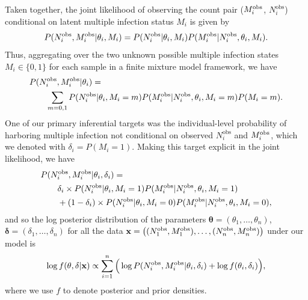 \documentclass[10pt,letterpaper]{article}
\newcommand{\MI}{M^{\text{\text{obs}}}}
\begin{document}
Taken together, the joint likelihood of observing the count pair  ($\MI_i$, $N^{\text{obs}}_i$) conditional on latent multiple infection status $M_i$ is given by 
\begin{equation}
P(N^{\text{obs}}_i, \MI_i | \theta_i, M_i) = P(N^{\text{obs}}_i |  \theta_i, M_i)P(\MI_i | N^{\text{obs}}_i, \theta_i, M_i).
\end{equation}
Thus, aggregating over the two unknown possible multiple infection states $M_i\in\{0,1\}$ for each sample in a finite mixture model framework, we have
\begin{equation}
\begin{split}
& P(N^{\text{obs}}_i, \MI_i | \theta_i) = \\
&\quad\quad \sum_{m = 0,1} P(N^{\text{obs}}_i | \theta_i, M_i=m)P(\MI_i | N^{\text{obs}}_i, \theta_i, M_i=m)P(M_i=m).
\end{split}
\end{equation}
One of our primary inferential targets was the individual-level probability of harboring multiple infection not conditional on observed $N^\text{obs}_i$ and $\MI_i$, which we denoted with $\delta_i = P(M_i = 1)$. Making this target explicit in the joint likelihood, we have
\begin{subequations}
    \begin{align}
    &P(N^{\text{obs}}_i, \MI_i | \theta_i, \delta_i) = \\
    &\quad\quad \delta_i \times P(N^{\text{obs}}_i | \theta_i, M_i=1)P(\MI_i | N^{\text{obs}}_i, \theta_i, M_i=1)\label{eq:lkl-MI1} \\ 
    & \quad\quad + (1-\delta_i)\times P(N^{\text{obs}}_i | \theta_i, M_i=0)P(\MI_i | N^{\text{obs}}_i, \theta_i, M_i=0),
    \end{align}
\end{subequations}
and so the log posterior distribution of the parameters $\mathbf{\theta} = (\theta_1,\dotsc,\theta_n)$, $\mathbf{\delta} = (\delta_1,\dotsc,\delta_n)$ for all the data $\mathbf{x} = \big( (N^{\text{obs}}_1, \MI_1),\dotsc,(N^{\text{obs}}_n, \MI_n)\big)$  under our model is
\begin{equation}
\log f(\mathbf{\theta}, \mathbf{\delta} | \mathbf{x}) \propto \sum_{i=1}^n \Big( \log P(N^{\text{obs}}_i, \MI_i | \theta_i, \delta_i) + \log f(\theta_i,\delta_i) \Big),
\label{eq:model_ind_posterior}
\end{equation}
where we use $f$ to denote posterior and prior densities.
\end{document}
